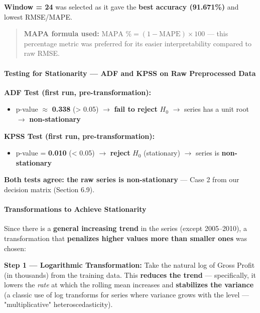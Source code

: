 \documentclass[12pt,openany]{book}
\begin{document}
\textbf{Window = 24} was selected as it gave the \textbf{best accuracy (91.671\%)} and lowest RMSE/MAPE.

\begin{quote}
\textbf{MAPA formula used:} \(\text{MAPA \%} = (1 - \text{MAPE}) \times 100\) --- this percentage metric was preferred for its easier interpretability compared to raw RMSE.\par

\end{quote}

\paragraph{Testing for Stationarity --- ADF and KPSS on Raw Preprocessed Data}

\textbf{ADF Test (first run, pre-transformation):}
\begin{itemize}[leftmargin=*]
    \item p-value \(\approx\) \textbf{0.338} (> 0.05) \(\rightarrow\) \textbf{fail to reject} \(H_0\) \(\rightarrow\) series has a unit root \(\rightarrow\) \textbf{non-stationary}
\end{itemize}

\textbf{KPSS Test (first run, pre-transformation):}
\begin{itemize}[leftmargin=*]
    \item p-value = \textbf{0.010} (< 0.05) \(\rightarrow\) \textbf{reject} \(H_0\) (stationary) \(\rightarrow\) series is \textbf{non-stationary}
\end{itemize}

\textbf{Both tests agree: the raw series is non-stationary} --- Case 2 from our decision matrix (Section 6.9).

\paragraph{Transformations to Achieve Stationarity}

Since there is a \textbf{general increasing trend} in the series (except 2005--2010), a transformation that \textbf{penalizes higher values more than smaller ones} was chosen:

\textbf{Step 1 --- Logarithmic Transformation:}
Take the natural log of Gross Profit (in thousands) from the training data. This \textbf{reduces the trend} --- specifically, it lowers the \textit{rate} at which the rolling mean increases and \textbf{stabilizes the variance} (a classic use of log transforms for series where variance grows with the level --- "multiplicative" heteroscedasticity).
\end{document}

